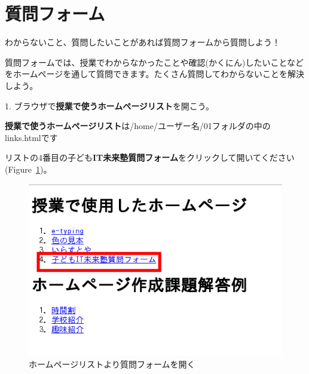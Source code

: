 \newpage
\section{質問フォーム}

わからないこと、質問したいことがあれば質問フォームから質問しよう！

質問フォームでは、授業でわからなかったことや確認(かくにん)したいことなどをホームページを通して質問できます。たくさん質問してわからないことを解決しよう。

1.
ブラウザで\textbf{授業で使うホームページリスト}を開こう。

\textbf{授業で使うホームページリスト}は/home/ユーザー名/01フォルダの中のlinks.htmlです

リストの4番目の子ども\textbf{IT未来塾質問フォーム}をクリックして開いてください(Figure~\ref{fig:prog_menu})。


\begin{description}
    \item {}
\end{description}

\begin{figure}[H]
    \begin{center}
      \includegraphics[width=11.231cm,height=7.613cm]{text04-img/textbook-img245.png}
      \caption{ホームページリストより質問フォームを開く}
    \end{center}
    \label{fig:prog_menu}
\end{figure}

